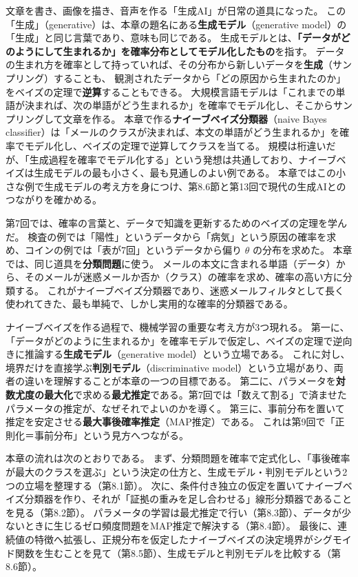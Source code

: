 文章を書き、画像を描き、音声を作る「生成AI」が日常の道具になった。
この「生成」（generative）は、本章の題名にある\textbf{生成モデル}（generative model）の「生成」と同じ言葉であり、意味も同じである。
生成モデルとは、\textbf{「データがどのようにして生まれるか」を確率分布としてモデル化したもの}を指す。
データの生まれ方を確率として持っていれば、その分布から新しいデータを\textbf{生成}（サンプリング）することも、
観測されたデータから「どの原因から生まれたのか」をベイズの定理で\textbf{逆算}することもできる。
大規模言語モデルは「これまでの単語が決まれば、次の単語がどう生まれるか」を確率でモデル化し、そこからサンプリングして文章を作る。
本章で作る\textbf{ナイーブベイズ分類器}（naive Bayes classifier）は「メールのクラスが決まれば、本文の単語がどう生まれるか」を確率でモデル化し、ベイズの定理で逆算してクラスを当てる。
規模は桁違いだが、「生成過程を確率でモデル化する」という発想は共通しており、ナイーブベイズは生成モデルの最も小さく、最も見通しのよい例である。
本章ではこの小さな例で生成モデルの考え方を身につけ、第8.6節と第13回で現代の生成AIとのつながりを確かめる。

第7回では、確率の言葉と、データで知識を更新するためのベイズの定理を学んだ。
検査の例では「陽性」というデータから「病気」という原因の確率を求め、コインの例では「表が7回」というデータから偏り $\theta$ の分布を求めた。
本章では、同じ道具を\textbf{分類問題}に使う。
メールの本文に含まれる単語（データ）から、そのメールが迷惑メールか否か（クラス）の確率を求め、確率の高い方に分類する。
これがナイーブベイズ分類器であり、迷惑メールフィルタとして長く使われてきた、最も単純で、しかし実用的な確率的分類器である。

ナイーブベイズを作る過程で、機械学習の重要な考え方が3つ現れる。
第一に、「データがどのように生まれるか」を確率モデルで仮定し、ベイズの定理で逆向きに推論する\textbf{生成モデル}（generative model）という立場である。
これに対し、境界だけを直接学ぶ\textbf{判別モデル}（discriminative model）という立場があり、両者の違いを理解することが本章の一つの目標である。
第二に、パラメータを\textbf{対数尤度の最大化}で求める\textbf{最尤推定}である。第7回では「数えて割る」で済ませたパラメータの推定が、なぜそれでよいのかを導く。
第三に、事前分布を置いて推定を安定させる\textbf{最大事後確率推定}（MAP推定）である。
これは第9回で「正則化＝事前分布」という見方へつながる。

本章の流れは次のとおりである。
まず、分類問題を確率で定式化し、「事後確率が最大のクラスを選ぶ」という決定の仕方と、生成モデル・判別モデルという2つの立場を整理する（第8.1節）。
次に、条件付き独立の仮定を置いてナイーブベイズ分類器を作り、それが「証拠の重みを足し合わせる」線形分類器であることを見る（第8.2節）。
パラメータの学習は最尤推定で行い（第8.3節）、データが少ないときに生じるゼロ頻度問題をMAP推定で解決する（第8.4節）。
最後に、連続値の特徴へ拡張し、正規分布を仮定したナイーブベイズの決定境界がシグモイド関数を生むことを見て（第8.5節）、生成モデルと判別モデルを比較する（第8.6節）。

